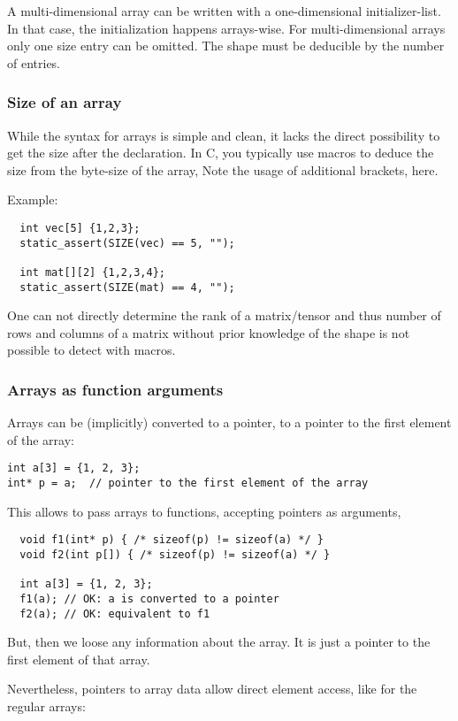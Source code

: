 A multi-dimensional array can be written with a one-dimensional initializer-list. In that case, the initialization happens arrays-wise.
%
%
For multi-dimensional arrays only one size entry can be omitted. The shape must be deducible by the number of entries.


\subsubsection{Size of an array}
While the syntax for arrays is simple and clean, it lacks the direct possibility to get the size after the declaration. In C, you typically
use macros to deduce the size from the byte-size of the array, \ie
%
%
Note the usage of additional brackets, here.

Example:
\begin{verbatim}
  int vec[5] {1,2,3};
  static_assert(SIZE(vec) == 5, "");

  int mat[][2] {1,2,3,4};
  static_assert(SIZE(mat) == 4, "");
\end{verbatim}

One can not directly determine the rank of a matrix/tensor and thus number of rows and columns of a matrix without prior knowledge of the shape
is not possible to detect with macros.


\subsubsection{Arrays as function arguments}
Arrays can be (implicitly) converted to a pointer, \ie to a pointer to the first element of the array:
%
\begin{verbatim}
int a[3] = {1, 2, 3};
int* p = a;  // pointer to the first element of the array
\end{verbatim}
%
This allows to pass arrays to functions, accepting pointers as arguments, \ie
%
\begin{verbatim}
  void f1(int* p) { /* sizeof(p) != sizeof(a) */ }
  void f2(int p[]) { /* sizeof(p) != sizeof(a) */ }

  int a[3] = {1, 2, 3};
  f1(a); // OK: a is converted to a pointer
  f2(a); // OK: equivalent to f1
\end{verbatim}
%
But, then we loose any information about the array. It is just a pointer to the first element of that array.

Nevertheless, pointers to array data allow direct element access, like for the regular arrays:
%

